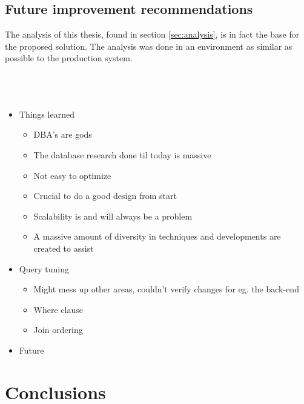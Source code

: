 \documentclass{cslthse-msc}
\begin{document}
\section{Future improvement recommendations}
The analysis of this thesis, found in section \ref{sec:analysis}, is in fact the base for the proposed solution. The analysis was done in an environment as similar as possible to the production system. 
\\\\\\\\ 

\begin{itemize}

\item Things learned
	\begin{itemize}
	\item DBA's are gods
	\item The database research done til today is massive
	\item Not easy to optimize 
	\item Crucial to do a good design from start
	\item Scalability is and will always be a problem
	\item A massive amount of diversity in techniques and developments are created to assist
	\end{itemize}


\item Query tuning
	\begin{itemize}
	\item Might mess up other areas, couldn't verify changes for eg. the back-end
	\item Where clause
	\item Join ordering
	\end{itemize}

\item Future
\end{itemize}

\chapter{Conclusions}\label{sec:conclusions}




\end{document}
